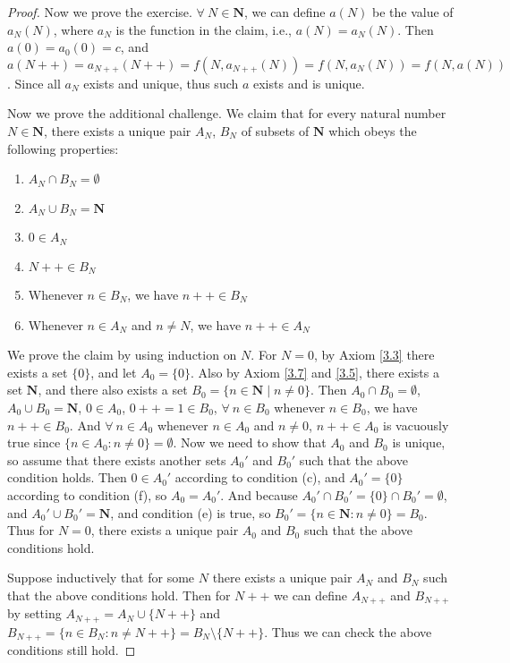 \begin{proof}
Now we prove the exercise.
\(\forall\ N \in \mathbf{N}\), we can define \(a(N)\) be the value of \(a_N(N)\), where \(a_N\) is the function in the claim, i.e., \(a(N) = a_{N}(N)\).
Then \(a(0) = a_0(0) = c\), and \(a(N++) = a_{N++}(N++) = f(N, a_{N++}(N)) = f(N, a_{N}(N)) = f(N, a(N))\).
Since all \(a_N\) exists and unique, thus such \(a\) exists and is unique.

Now we prove the additional challenge.
We claim that for every natural number \(N \in \mathbf{N}\), there exists a unique pair \(A_N\), \(B_N\) of subsets of \(\mathbf{N}\) which obeys the following properties:
\begin{enumerate}
    \item \(A_N \cap B_N = \emptyset\)
    \item \(A_N \cup B_N = \mathbf{N}\)
    \item \(0 \in A_N\)
    \item \(N++ \in B_N\)
    \item Whenever \(n \in B_N\), we have \(n++ \in B_N\)
    \item Whenever \(n \in A_N\) and \(n \neq N\), we have \(n++ \in A_N\)
\end{enumerate}

We prove the claim by using induction on \(N\).
For \(N = 0\), by Axiom \ref{3.3} there exists a set \(\{0\}\), and let \(A_0 = \{0\}\).
Also by Axiom \ref{3.7} and \ref{3.5}, there exists a set \(\mathbf{N}\), and there also exists a set \(B_0 = \{n \in \mathbf{N} \mid n \neq 0\}\).
Then \(A_0 \cap B_0 = \emptyset\), \(A_0 \cup B_0 = \mathbf{N}\), \(0 \in A_0\), \(0++ = 1 \in B_0\), \(\forall\ n \in B_0\) whenever \(n \in B_0\), we have \(n++ \in B_0\).
And \(\forall\ n \in A_0\) whenever \(n \in A_0\) and \(n \neq 0\), \(n++ \in A_0\) is vacuously true since \(\{n \in A_0 : n \neq 0\} = \emptyset\).
Now we need to show that \(A_0\) and \(B_0\) is unique, so assume that there exists another sets \(A_0'\) and \(B_0'\) such that the above condition holds.
Then \(0 \in A_0'\) according to condition (c), and \(A_0' = \{0\}\) according to condition (f), so \(A_0 = A_0'\).
And because \(A_0' \cap B_0' = \{0\} \cap B_0' = \emptyset\), and \(A_0' \cup B_0' = \mathbf{N}\), and condition (e) is true, so \(B_0' = \{n \in \mathbf{N} : n \neq 0\} = B_0\).
Thus for \(N = 0\), there exists a unique pair \(A_0\) and \(B_0\) such that the above conditions hold.

Suppose inductively that for some \(N\) there exists a unique pair \(A_N\) and \(B_N\) such that the above conditions hold.
Then for \(N++\) we can define \(A_{N++}\) and \(B_{N++}\) by setting \(A_{N++} = A_N \cup \{N++\}\) and \(B_{N++} = \{n \in B_N : n \neq N++\} = B_N \setminus \{N++\}\).
Thus we can check the above conditions still hold.


\end{proof}
